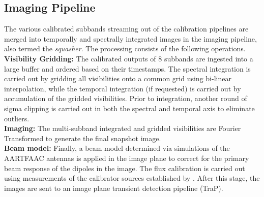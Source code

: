 \documentclass{ws-jai}
\begin{document}
\subsection{Imaging Pipeline} 
The various calibrated  subbands streaming out of the  calibration pipelines are
merged into temporally and spectrally integrated images in the imaging pipeline,
also termed  the \textit  {squasher}. The processing  consists of  the following
operations.\\

\noindent \textbf  {Visibility Gridding:} The  calibrated outputs of  8 subbands
are ingested  into a large  buffer and ordered  based on their  timestamps.  The
spectral integration is  carried out by gridding all visibilities  onto a common
grid using bi-linear interpolation, while the temporal integration (if requested)
is  carried  out   by  accumulation  of  the  gridded   visibilities.  Prior  to
integration, another round of sigma clipping is carried out in both the spectral
and temporal axis to eliminate outliers.\\

\noindent   \textbf  {Imaging:}   The  multi-subband   integrated  and   gridded
visibilities are Fourier Transformed to generate the final snapshot image. \\

\noindent \textbf  {Beam model:} Finally, a beam model  determined via simulations
of  the AARTFAAC  antennas is  applied in  the image  plane to  correct for  the
primary  beam response  of the  dipoles in  the image.  The flux  calibration is
carried out using  measurements of the calibrator sources  established by \citet
{scaife2012broad}.  After  this stage,  the images  are sent  to an  image plane
transient detection pipeline (TraP).

\end{document}
